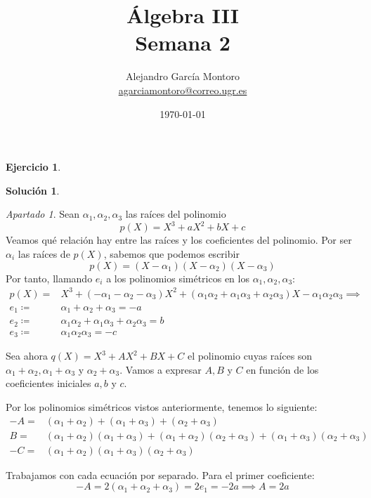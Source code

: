 \documentclass[a4paper, 11pt]{article}
\title{Álgebra III \\ Semana 2}
\author{Alejandro García Montoro\\
    \href{mailto:agarciamontoro@correo.ugr.es}{agarciamontoro@correo.ugr.es}}
\date{\today}
\theoremstyle{definition}
\newtheorem{ejercicio}{Ejercicio}
\newtheorem*{solucion}{Solución}
\theoremstyle{remark}
\newtheorem{apartado}{Apartado}[ejercicio]
\begin{document}
  \maketitle

  \begin{ejercicio}
  \end{ejercicio}

  \begin{solucion}
      \begin{apartado}
          Sean $\alpha_1, \alpha_2, \alpha_3$ las raíces del polinomio \[p(X) = X^3 + aX^2 + bX +c\]
          Veamos qué relación hay entre las raíces y los coeficientes del polinomio. Por ser $\alpha_i$ las raíces de $p(X)$, sabemos que podemos escribir \[p(X) = (X-\alpha_1)(X-\alpha_2)(X-\alpha_3)\]
          Por tanto, llamando $e_i$ a los polinomios simétricos en los $\alpha_1, \alpha_2, \alpha_3$:
          \begin{align*}
             p(X) =& X^3 + (-\alpha_1 -\alpha_2 -\alpha_3)X^2 + (\alpha_1\alpha_2 + \alpha_1\alpha_3 + \alpha_2\alpha_3)X - \alpha_1\alpha_2\alpha_3 \implies \\
             e_1 \coloneqq& \alpha_1 + \alpha_2 + \alpha_3 = -a\\
             e_2 \coloneqq& \alpha_1\alpha_2 + \alpha_1\alpha_3 + \alpha_2\alpha_3 = b\\
             e_3 \coloneqq& \alpha_1\alpha_2\alpha_3 = -c
          \end{align*}

          Sea ahora $q(X) = X^3 + AX^2 + BX + C$ el polinomio cuyas raíces son $\alpha_1+\alpha_2, \alpha_1+\alpha_3$ y $\alpha_2+\alpha_3$. Vamos a expresar $A,B$ y $C$ en función de los coeficientes iniciales $a,b$ y $c$.

          Por los polinomios simétricos vistos anteriormente, tenemos lo siguiente:
          \begin{align*}
              -A =& (\alpha_1+\alpha_2) + (\alpha_1+\alpha_3) + (\alpha_2+\alpha_3) \\
              B =& (\alpha_1+\alpha_2)(\alpha_1+\alpha_3) + (\alpha_1+\alpha_2)(\alpha_2+\alpha_3) + (\alpha_1+\alpha_3)(\alpha_2+\alpha_3)\\
              -C =& (\alpha_1+\alpha_2)(\alpha_1+\alpha_3)(\alpha_2+\alpha_3)
          \end{align*}

          Trabajamos con cada ecuación por separado. Para el primer coeficiente:
          \[
          -A = 2(\alpha_1 + \alpha_2 + \alpha_3) = 2e_1 = -2a \implies \boxed{A = 2a}
          \]


\end{apartado}
\end{solucion}
\end{document}
